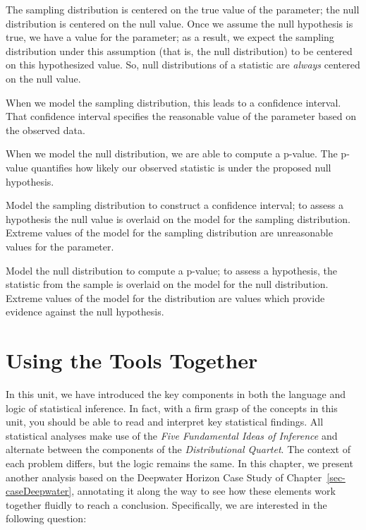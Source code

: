 \documentclass[
  letterpaper,
  DIV=11,
  numbers=noendperiod]{scrreprt}
\theoremstyle{definition}
\theoremstyle{definition}
\theoremstyle{plain}
\theoremstyle{remark}
\begin{document}
The sampling distribution is centered on the true value of the
parameter; the null distribution is centered on the null value. Once we
assume the null hypothesis is true, we have a value for the parameter;
as a result, we expect the sampling distribution under this assumption
(that is, the null distribution) to be centered on this hypothesized
value. So, null distributions of a statistic are \emph{always} centered
on the null value.

When we model the sampling distribution, this leads to a confidence
interval. That confidence interval specifies the reasonable value of the
parameter based on the observed data.

When we model the null distribution, we are able to compute a p-value.
The p-value quantifies how likely our observed statistic is under the
proposed null hypothesis.

\begin{tcolorbox}[enhanced jigsaw, colbacktitle=quarto-callout-tip-color!10!white, colback=white, left=2mm, title=\textcolor{quarto-callout-tip-color}{\faLightbulb}\hspace{0.5em}{Big Idea}, toptitle=1mm, leftrule=.75mm, breakable, bottomrule=.15mm, arc=.35mm, rightrule=.15mm, toprule=.15mm, coltitle=black, opacityback=0, colframe=quarto-callout-tip-color-frame, opacitybacktitle=0.6, bottomtitle=1mm, titlerule=0mm]

Model the sampling distribution to construct a confidence interval; to
assess a hypothesis the null value is overlaid on the model for the
sampling distribution. Extreme values of the model for the sampling
distribution are unreasonable values for the parameter.

Model the null distribution to compute a p-value; to assess a
hypothesis, the statistic from the sample is overlaid on the model for
the null distribution. Extreme values of the model for the distribution
are values which provide evidence against the null hypothesis.

\end{tcolorbox}

\chapter{Using the Tools Together}\label{sec-recaplanguage}

In this unit, we have introduced the key components in both the language
and logic of statistical inference. In fact, with a firm grasp of the
concepts in this unit, you should be able to read and interpret key
statistical findings. All statistical analyses make use of the
\emph{Five Fundamental Ideas of Inference} and alternate between the
components of the \emph{Distributional Quartet}. The context of each
problem differs, but the logic remains the same. In this chapter, we
present another analysis based on the Deepwater Horizon Case Study of
Chapter~\ref{sec-caseDeepwater}, annotating it along the way to see how
these elements work together fluidly to reach a conclusion.
Specifically, we are interested in the following question:
\end{document}
